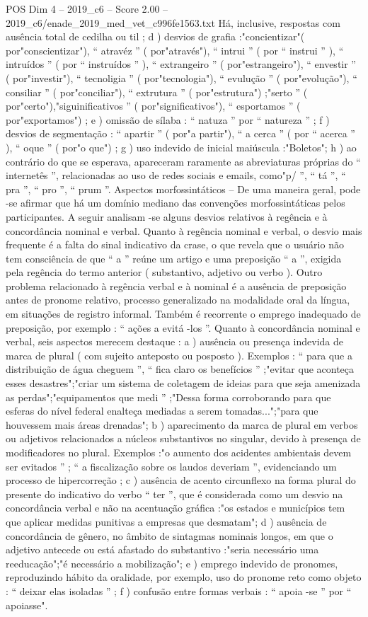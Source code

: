 \begin{textsample}{POS Dim 4 – 2019\_c6 – Score 2.00 – 2019\_c6/enade\_2019\_med\_vet\_c996fe1563.txt}
Há, inclusive, respostas com ausência total de cedilha ou til ; d ) desvios de grafia :"concientizar"( por"conscientizar"), “ atravéz ” ( por"através"), “ intrui ” ( por “ instrui ” ), “ intruídos ” ( por “ instruídos ” ), “ extrangeiro ” ( por"estrangeiro"), “ envestir ” ( por"investir"), “ tecnoligia ” ( por"tecnologia"), “ evulução ” ( por"evolução"), “ consiliar ” ( por"conciliar"), “ extrutura ” ( por"estrutura") ;"serto ” ( por"certo"),"siguinificativos ” ( por"significativos"), “ esportamos ” ( por"exportamos") ; e ) omissão de sílaba : “ natuza ” por “ natureza ” ; f ) desvios de segmentação : “ apartir ” ( por"a partir"), “ a cerca ” ( por “ acerca ” ), “ oque ” ( por"o que") ; g ) uso indevido de inicial maiúscula :"Boletos"; h ) ao contrário do que se esperava, apareceram raramente as abreviaturas próprias do “ internetês ”, relacionadas ao uso de redes sociais e emails, como"p/ ”, “ tá ”, “ pra ”, “ pro ”, “ prum ”.
Aspectos morfossintáticos – De uma maneira geral, pode -se afirmar que há um domínio mediano das convenções morfossintáticas pelos participantes.
A seguir analisam -se alguns desvios relativos à regência e à concordância nominal e verbal.
Quanto à regência nominal e verbal, o desvio mais frequente é a falta do sinal indicativo da crase, o que revela que o usuário não tem consciência de que “ a ” reúne um artigo e uma preposição “ a ”, exigida pela regência do termo anterior ( substantivo, adjetivo ou verbo ).
Outro problema relacionado à regência verbal e à nominal é a ausência de preposição antes de pronome relativo, processo generalizado na modalidade oral da língua, em situações de registro informal.
Também é recorrente o emprego inadequado de preposição, por exemplo : “ ações a evitá -los ”.
Quanto à concordância nominal e verbal, seis aspectos merecem destaque : a ) ausência ou presença indevida de marca de plural ( com sujeito anteposto ou posposto ).
Exemplos : “ para que a distribuição de água cheguem ”, “ fica claro os benefícios ” ;"evitar que aconteça esses desastres";"criar um sistema de coletagem de ideias para que seja amenizada as perdas";"equipamentos que medi ” ;"Dessa forma corroborando para que esferas do nível federal enalteça mediadas a serem tomadas...";"para que houvessem mais áreas drenadas"; b ) aparecimento da marca de plural em verbos ou adjetivos relacionados a núcleos substantivos no singular, devido à presença de modificadores no plural.
Exemplos :"o aumento dos acidentes ambientais devem ser evitados ” ; “ a fiscalização sobre os laudos deveriam ”, evidenciando um processo de hipercorreção ; c ) ausência de acento circunflexo na forma plural do presente do indicativo do verbo “ ter ”, que é considerada como um desvio na concordância verbal e não na acentuação gráfica :"os estados e municípios tem que aplicar medidas punitivas a empresas que desmatam"; d ) ausência de concordância de gênero, no âmbito de sintagmas nominais longos, em que o adjetivo antecede ou está afastado do substantivo :"seria necessário uma reeducação";"é necessário a mobilização"; e ) emprego indevido de pronomes, reproduzindo hábito da oralidade, por exemplo, uso do pronome reto como objeto : “ deixar elas isoladas ” ; f ) confusão entre formas verbais : “ apoia -se ” por “ apoiasse".

\end{textsample}
